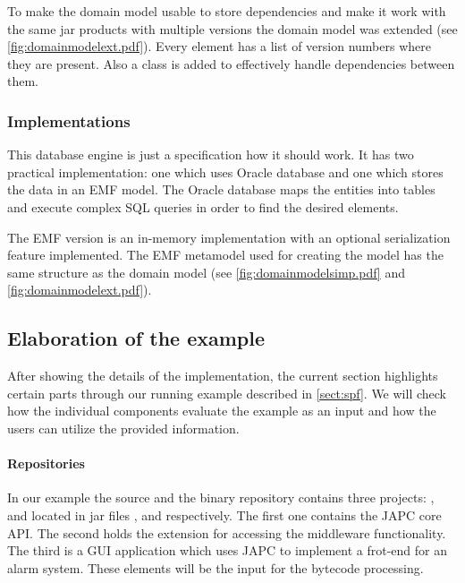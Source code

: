 To make the domain model usable to store dependencies and make it work with the
same jar products with multiple versions the domain model was extended (see
\autoref{fig:domainmodelext.pdf}).  Every element has a list of version numbers where they are
present. Also a  class is added to effectively handle
dependencies between them.

\subsubsection{Implementations}
This database engine is just a specification how it should work. It has two
practical implementation: one which uses Oracle database and one which stores
the data in an EMF model. The Oracle database maps the entities into tables and
execute complex SQL queries in order to find the desired elements.

The EMF version is an in-memory implementation with an optional serialization
feature implemented. The EMF metamodel used for creating the model has the same
structure as the domain model (see \autoref{fig:domainmodelsimp.pdf} and
\autoref{fig:domainmodelext.pdf}).



\subsection{Elaboration of the example}\label{sect:elabex1}
After showing the details of the implementation, the current section highlights
certain parts through our running example described in \autoref{sect:spf}.
We will check how the individual components evaluate the example as an input and
how the users can utilize the provided information. 

\paragraph{Repositories}
In our example the source and the binary repository contains three pro\-jects:
,  and  located in jar
files ,  and
 respectively. The first one contains the JAPC core
API. The second holds the extension for accessing the middleware functionality.
The third is a GUI application which uses JAPC to implement a frot-end for an
alarm system. These elements will be the input for the bytecode processing.

